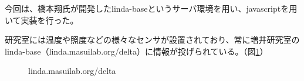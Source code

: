 今回は、橋本翔氏が開発したlinda-base\cite{hoge10}というサーバ環境を用い、javascriptを用いて実装を行った。

研究室には温度や照度などの様々なセンサが設置されており、常に増井研究室のlinda-base（linda.masuilab.org/delta）に情報が投げられている。（図\ref{fig:linda}）

\begin{figure}[htbp]
    \begin{center}
    \end{center}
    \caption{linda.masuilab.org/delta}
    \label{fig:linda}
\end{figure}






